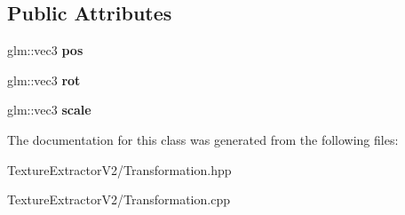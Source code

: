 \subsection*{Public Attributes}
\begin{DoxyCompactItemize}
\item 
\hypertarget{class_transformation_aeaf15f9849ac1a0dc2b5f7a7da12e0ed}{}glm\+::vec3 {\bfseries pos}\label{class_transformation_aeaf15f9849ac1a0dc2b5f7a7da12e0ed}

\item 
\hypertarget{class_transformation_a4d41188f5f002453bb288c32452c79d2}{}glm\+::vec3 {\bfseries rot}\label{class_transformation_a4d41188f5f002453bb288c32452c79d2}

\item 
\hypertarget{class_transformation_abaca94f82d6d4c1515c133e638624724}{}glm\+::vec3 {\bfseries scale}\label{class_transformation_abaca94f82d6d4c1515c133e638624724}

\end{DoxyCompactItemize}


The documentation for this class was generated from the following files\+:\begin{DoxyCompactItemize}
\item 
Texture\+Extractor\+V2/Transformation.\+hpp\item 
Texture\+Extractor\+V2/Transformation.\+cpp\end{DoxyCompactItemize}
